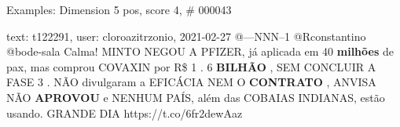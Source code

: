 \begin{frame}{Examples: Dimension 5 pos, score 4, \# 000043}
\footnotesize
\begin{exampleblock}{text: t122291, user: cloroazitrzonio, 2021-02-27}
@---NNN--1 @Rconstantino @bode-sala Calma! MINTO NEGOU A PFIZER, já aplicada em 
40 \textbf{milhões} de pax, mas comprou COVAXIN por R\$ 1 . 6 \textbf{BILHÃO} , 
SEM CONCLUIR A FASE 3 . NÃO divulgaram a EFICÁCIA NEM O \textbf{CONTRATO} , 
ANVISA NÃO \textbf{APROVOU} e NENHUM PAÍS, além das COBAIAS INDIANAS, estão 
usando. GRANDE DIA  
https://t.co/6fr2dewAaz 
\end{exampleblock}
\end{frame}
